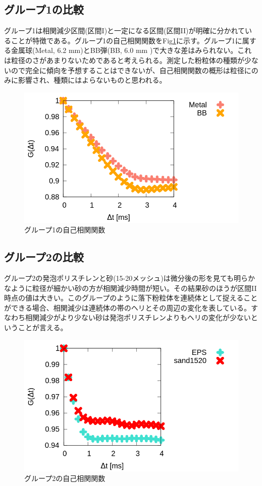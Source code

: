 \documentclass[a4paper,10pt,twocolumn,dvipdfmx]{jsarticle}
\newcommand{\II}{I\hspace{-.1em}I}
\begin{document}
\subsection{グループ1の比較}
グループ1は相関減少区間(区間I)と一定になる区間(区間\II )が明確に分かれていることが特徴である。グループ1の自己相関関数をFig\ref{fig:one}に示す。グループ1に属する金属球(Metal, 6.2 mm)とBB弾(BB, 6.0 mm )で大きな差はみられない。これは粒径のさがあまりないためであると考えられる。測定した粉粒体の種類が少ないので完全に傾向を予想することはできないが、自己相関関数の概形は粒径にのみに影響され、種類にはよらないものと思われる。
\begin{figure}[H]
	\includegraphics[scale=0.4]{one.png}
	\caption{グループ1の自己相関関数}
	\label{fig:one}
\end{figure}
\subsection{グループ2の比較}
グループ2の発泡ポリスチレンと砂(15-20メッシュ)は微分後の形を見ても明らかなように粒径が細かい砂の方が相関減少時間が短い。その結果砂のほうが区間\II 時点の値は大きい。このグループのように落下粉粒体を連続体として捉えることができる場合、相関減少は連続体の帯のヘリとその周辺の変化を表している。すなわち相関減少がより少ない砂は発泡ポリスチレンよりもヘリの変化が少ないということが言える。
\begin{figure}[H]
	\includegraphics[scale=0.4]{two_big.png}
	\caption{グループ2の自己相関関数}
	\label{fig:two}
\end{figure}
\end{document}
